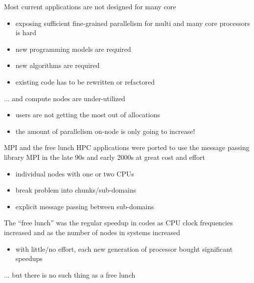 \documentclass[aspectratio=43]{beamer}
\begin{document}
\begin{frame}[fragile]{}
    \begin{info}{Most current applications are not designed for many core}
        \begin{itemize}
            \item exposing sufficient fine-grained parallelism for multi and many core processors is hard
            \item new programming models are required
            \item new algorithms are required
            \item existing code has to be rewritten or refactored
        \end{itemize}
    \end{info}

    \begin{info}{... and compute nodes are under-utilized}
        \begin{itemize}
            \item users are not getting the most out of allocations
            \item the amount of parallelism on-node is only going to increase!
        \end{itemize}
    \end{info}
\end{frame}

\begin{frame}[fragile]{}
    \begin{info}{MPI and the free lunch}
        HPC applications were ported to use the message passing library MPI in the late 90s and early 2000s at great cost and effort
        \begin{itemize}
            \item individual nodes with one or two CPUs
            \item break problem into chunks/sub-domains
            \item explicit message passing between sub-domains
        \end{itemize}
        The ``free lunch'' was the regular speedup in codes as CPU clock frequencies increased and as the number of nodes in systems increased
        \begin{itemize}
            \item with little/no effort, each new generation of processor bought significant speedups
        \end{itemize}
    \end{info}

    \centering ...  but there is no such thing as a free lunch
\end{frame}
\end{document}
